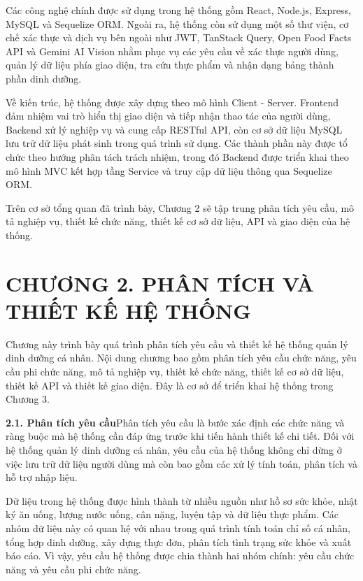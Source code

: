 Các công nghệ chính được sử dụng trong hệ thống gồm React, Node.js, Express, MySQL và Sequelize ORM. Ngoài ra, hệ thống còn sử dụng một số thư viện, cơ chế xác thực và dịch vụ bên ngoài như JWT, TanStack Query, Open Food Facts API và Gemini AI Vision nhằm phục vụ các yêu cầu về xác thực người dùng, quản lý dữ liệu phía giao diện, tra cứu thực phẩm và nhận dạng bảng thành phần dinh dưỡng.

Về kiến trúc, hệ thống được xây dựng theo mô hình Client - Server. Frontend đảm nhiệm vai trò hiển thị giao diện và tiếp nhận thao tác của người dùng, Backend xử lý nghiệp vụ và cung cấp RESTful API, còn cơ sở dữ liệu MySQL lưu trữ dữ liệu phát sinh trong quá trình sử dụng. Các thành phần này được tổ chức theo hướng phân tách trách nhiệm, trong đó Backend được triển khai theo mô hình MVC kết hợp tầng Service và truy cập dữ liệu thông qua Sequelize ORM.

Trên cơ sở tổng quan đã trình bày, Chương 2 sẽ tập trung phân tích yêu cầu, mô tả nghiệp vụ, thiết kế chức năng, thiết kế cơ sở dữ liệu, API và giao diện của hệ thống.


\chapter*{CHƯƠNG 2. PHÂN TÍCH VÀ THIẾT KẾ HỆ THỐNG}
Chương này trình bày quá trình phân tích yêu cầu và thiết kế hệ thống quản lý dinh dưỡng cá nhân. Nội dung chương bao gồm phân tích yêu cầu chức năng, yêu cầu phi chức năng, mô tả nghiệp vụ, thiết kế chức năng, thiết kế cơ sở dữ liệu, thiết kế API và thiết kế giao diện. Đây là cơ sở để triển khai hệ thống trong Chương 3.

\textbf{2.1. Phân tích yêu cầu}Phân tích yêu cầu là bước xác định các chức năng và ràng buộc mà hệ thống cần đáp ứng trước khi tiến hành thiết kế chi tiết. Đối với hệ thống quản lý dinh dưỡng cá nhân, yêu cầu của hệ thống không chỉ dừng ở việc lưu trữ dữ liệu người dùng mà còn bao gồm các xử lý tính toán, phân tích và hỗ trợ nhập liệu.

Dữ liệu trong hệ thống được hình thành từ nhiều nguồn như hồ sơ sức khỏe, nhật ký ăn uống, lượng nước uống, cân nặng, luyện tập và dữ liệu thực phẩm. Các nhóm dữ liệu này có quan hệ với nhau trong quá trình tính toán chỉ số cá nhân, tổng hợp dinh dưỡng, xây dựng thực đơn, phân tích tình trạng sức khỏe và xuất báo cáo. Vì vậy, yêu cầu hệ thống được chia thành hai nhóm chính: yêu cầu chức năng và yêu cầu phi chức năng.

